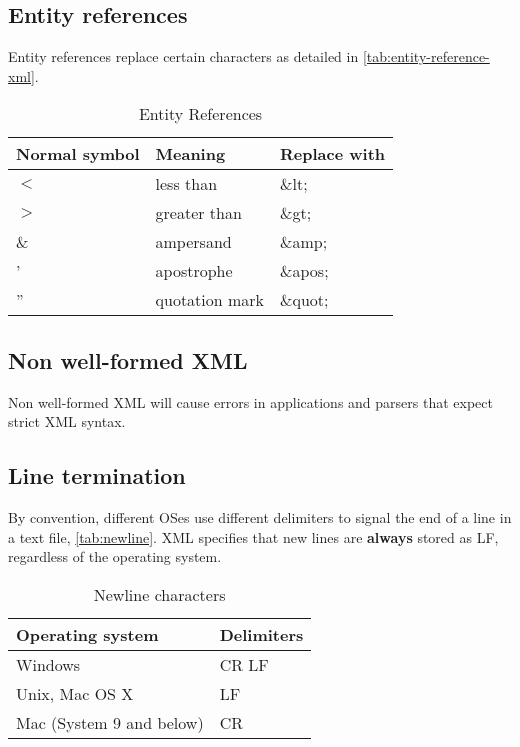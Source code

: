 \documentclass[slides]{pgnotes}
\newcommand{\entityref}[1]{\&#1;}
\begin{document}
\subsection{Entity references}

Entity references replace certain characters as detailed in \autoref{tab:entity-reference-xml}.

\begin{table}[htbp]
  \centering
  \begin{tabular}{l l l}
    \toprule
    \textbf{Normal symbol} & \textbf{Meaning} & \textbf{Replace with} \\
    \midrule
    $<$ & less than & \entityref{lt} \\
    $>$ & greater than & \entityref{gt} \\
    \& & ampersand & \entityref{amp} \\
    ' & apostrophe & \entityref{apos} \\
    '' & quotation mark & \entityref{quot} \\
    \bottomrule
  \end{tabular}
  \caption{Entity References}
  \label{tab:entity-reference-xml}
\end{table}


\subsection{Non well-formed XML}

Non well-formed XML will cause errors in applications and parsers that expect strict XML syntax.

\subsection{Line termination}

By convention, different OSes use different delimiters to signal the end of a line in a text file, \autoref{tab:newline}.
XML specifies that new lines are \textbf{always} stored as LF, regardless of the operating system. 

\begin{table}[htbp]
  \centering
  \begin{tabular}{l l}
    \toprule
    \textbf{Operating system} & \textbf{Delimiters} \\
    \midrule
    Windows & CR LF \\
    Unix, Mac OS X & LF \\
    Mac (System 9 and below) & CR \\ 
    \bottomrule
  \end{tabular}
  \caption{Newline characters}
  \label{tab:newline}
\end{table}
\end{document}
